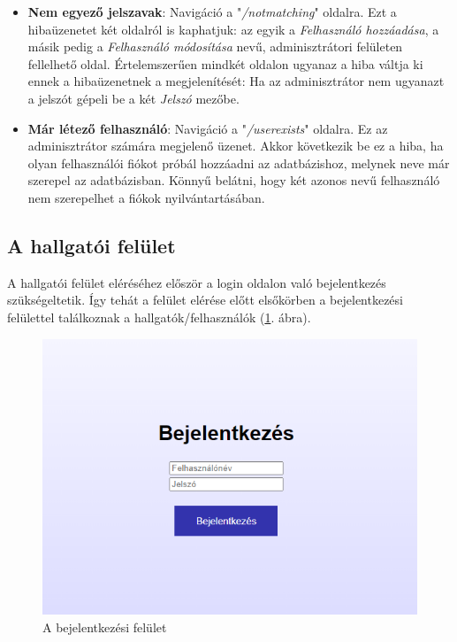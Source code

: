 \begin{itemize}
\item{\textbf{Nem egyező jelszavak}: Navigáció a "\textit{/notmatching}" oldalra. Ezt a hibaüzenetet két oldalról is kaphatjuk: az egyik a \textit{Felhasználó hozzáadása}, a másik pedig a \textit{Felhasználó módosítása} nevű, adminisztrátori felületen fellelhető oldal. Értelemszerűen mindkét oldalon ugyanaz a hiba váltja ki ennek a hibaüzenetnek a megjelenítését: Ha az adminisztrátor nem ugyanazt a jelszót gépeli be a két \textit{Jelszó} mezőbe.}
\item{\textbf{Már létező felhasználó}: Navigáció a "\textit{/userexists}" oldalra. Ez az adminisztrátor számára megjelenő üzenet. Akkor következik be ez a hiba, ha olyan felhasználói fiókot próbál hozzáadni az adatbázishoz, melynek neve már szerepel az adatbázisban. Könnyű belátni, hogy két azonos nevű felhasználó nem szerepelhet a fiókok nyilvántartásában.}
\end{itemize}


\subsection{A hallgatói felület}

A hallgatói felület eléréséhez először a login oldalon való bejelentkezés szükségeltetik. Így tehát a felület elérése előtt elsőkörben a bejelentkezési felülettel találkoznak a hallgatók/felhasználók (\ref{fig:login}. ábra). 

\begin{figure}[h]
	\centering
		\includegraphics[width=10truecm, height=7truecm]{images/bejelentkezes.png}
	\caption{A bejelentkezési felület}
	\label{fig:login}
\end{figure}

